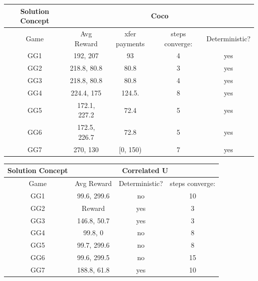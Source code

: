 \hspace{5mm}\begin{tabular}{||c||c|c|c|c||}
	\hline
	Solution Concept& \multicolumn{4}{|c||}{Coco}  \\ \hline
	Game & Avg Reward & xfer payments & steps converge: & Deterministic? \\ \hline \hline
	GG1 & 192, 207 & 93 & 4 & yes\\ \hline
	GG2 & 218.8, 80.8 & 80.8 & 3 & yes\\ \hline
	GG3 & 218.8, 80.8 & 80.8 & 4 & yes \\ \hline
	GG4 & 224.4, 175 & 124.5. & 8 & yes \\ \hline
	GG5 & 172.1, 227.2 & 72.4 & 5 & yes\\ \hline
	GG6 & 172.5, 226.7 & 72.8 & 5 & yes\\ \hline
	GG7 & 270, 130 & [0, 150) & 7 & yes\\ \hline
	
	
\end{tabular}

\vspace{10mm}

\hspace{5mm}\begin{tabular}{||c||c|c|c||}
	\hline
	Solution Concept&  \multicolumn{3}{|c||}{Correlated U}\\ \hline
	Game & Avg Reward & Deterministic? & steps converge:\\ \hline \hline
	GG1 & 99.6, 299.6 & no & 10 \\ \hline
	GG2 & Reward & yes & 3\\ \hline
	GG3 & 146.8, 50.7 & yes & 3\\ \hline
	GG4 & 99.8, 0 & no & 8 \\ \hline
	GG5 & 99.7, 299.6 & no & 8 \\ \hline
	GG6 & 99.6, 299.5 & no & 15 \\ \hline
	GG7 & 188.8, 61.8 & yes & 10 \\ \hline
	
	
\end{tabular}

